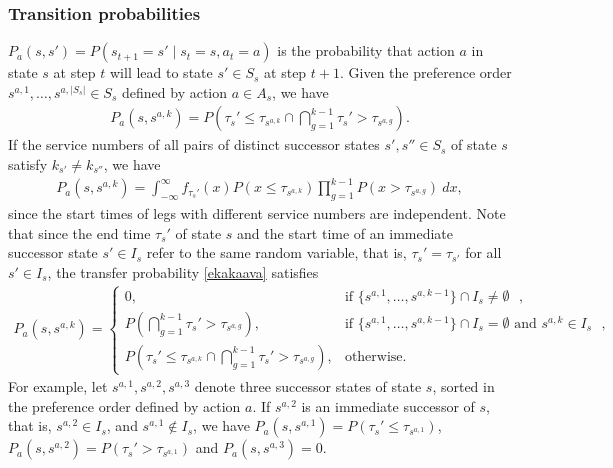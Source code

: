 \documentclass[dissertation,draft*]{aaltoseries}
\begin{document}
\subsubsection{Transition probabilities}
\label{transitiondef}
$P_a(s,s') = P(s_{t+1}=s' \mid s_t = s, a_t=a)$ is the probability that action $a$ in state $s$ 
at step $t$ will lead to state $s' \in S_s$ at step $t + 1$. 
Given the preference order $s^{a,1}, \ldots, s^{a,|S_s|} \in S_{s}$ defined by action $a \in A_s$, 
we have 
\begin{align}
\label{ekakaava}
P_a(s,s^{a,k}) 
= 
P\left(\tau_{s}' \leq \tau_{s^{a,k}} \cap \bigcap_{g=1}^{k-1} \tau_{s}' > \tau_{s^{a,g}} \right).
\end{align}
If the service numbers of all pairs of distinct successor states $s',s'' \in S_s$ of state $s$ satisfy $k_{s'} \neq k_{s''}$,
we have 
\begin{align*}
P_a(s,s^{a,k}) = \int_{-\infty}^{\infty} f_{\tau_{s}'}(x) P\left(x \leq \tau_{s^{a,k}} \right) 
\prod_{g=1}^{k-1} P\left(x > \tau_{s^{a,g}} \right) \ dx,
\end{align*}
since the start times of legs with different service numbers 
are independent.
Note that since the end time $\tau_s'$ of state $s$ and the start time of an immediate successor state $s' \in I_s$ refer to the same
random variable, that is, $\tau_s' = \tau_{s'}$ for all $s' \in I_s$, the transfer probability \eqref{ekakaava}
satisfies
\begin{align}
\label{ekakaava2}
P_a(s,s^{a,k}) = 
\left\{
\begin{array}{ll}
0, &  \mbox{if $\{s^{a,1},\ldots,s^{a,k-1}\} \cap I_s \neq \emptyset$ },\\ 
P\left(\bigcap_{g=1}^{k-1} \tau_{s}' > \tau_{s^{a,g}} \right), &  \mbox{if $\{s^{a,1},\ldots,s^{a,k-1}\} \cap I_s = \emptyset$ and $s^{a,k} \in I_{s}$ },\\ 
P\left(\tau_{s}' \leq \tau_{s^{a,k}} \cap \bigcap_{g=1}^{k-1} \tau_{s}' > \tau_{s^{a,g}} \right), & \mbox{otherwise.}
\end{array}
\right.
\end{align}
For example, let $s^{a,1},s^{a,2},s^{a,3}$ denote three successor states of state $s$, sorted in the preference
order defined by action $a$. If $s^{a,2}$ is an immediate successor of $s$, that is, $s^{a,2} \in I_s$, and $s^{a,1} \notin I_s$, 
we have $P_a(s,s^{a,1}) = P\left(\tau_{s}' \leq \tau_{s^{a,1}} \right)$, $P_a(s,s^{a,2}) = P\left( \tau_{s}' > \tau_{s^{a,1}} \right)$
and $P_a(s,s^{a,3}) = 0$.
\end{document}
